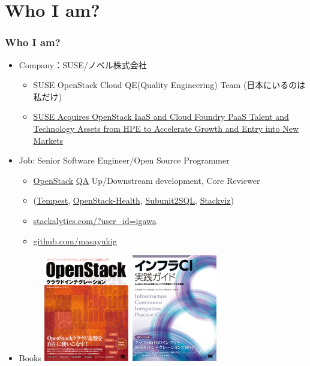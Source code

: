\documentclass[aspectratio=169,11pt,hyperref={colorlinks=true}]{beamer}
\begin{document}
\section{Who I am?}
\begin{frame}
  \frametitle{Who I am?}
  \begin{itemize}
    \item Company：SUSE/ノベル株式会社
      \begin{itemize}
        \item SUSE OpenStack Cloud QE(Quality Engineering) Team (日本にいるのは私だけ)
        \item[] \href{https://www.suse.com/newsroom/post/2016/suse-acquires-openstack-iaas-and-cloud-foundry-paas-talent-and-technology-assets-from-hpe-to-accelerate-growth-and-entry-into-new-markets/}{SUSE Acquires OpenStack IaaS and Cloud Foundry PaaS Talent and Technology Assets from HPE to Accelerate Growth and Entry into New Markets}
      \end{itemize}
    \item Job: Senior Software Engineer/Open Source Programmer
      \begin{itemize}
        \item \href{https://www.openstack.org/}{OpenStack}
         \href{https://wiki.openstack.org/wiki/QA}{QA} Up/Downstream development, Core Reviewer
        \item[] (\href{https://docs.openstack.org/developer/tempest/}{Tempest},
         \href{http://status.openstack.org/openstack-health/}{OpenStack-Health},
         \href{https://docs.openstack.org/developer/subunit2sql/}{Subunit2SQL},
         \href{https://docs.openstack.org/developer/stackviz/}{Stackviz})
        \item \href{http://stackalytics.com/?user_id=igawa&release=all&metric=all}{stackalytics.com/?user\_id=igawa}
        \item \href{https://github.com/masayukig}{github.com/masayukig}
      \end{itemize}
    \item Books \includegraphics[scale=0.2]{OpenStack_Integration_book.png}~\includegraphics[scale=0.2]{InfraCI_book.png}

\end{itemize}
\end{frame}
\end{document}
